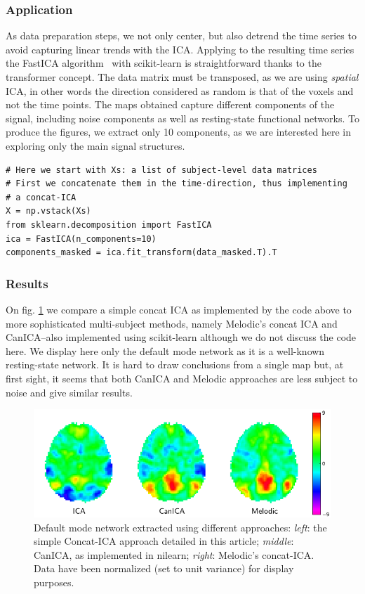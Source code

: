 \documentclass{frontiersSCNS} %
\begin{document}
\subsubsection{Application}

As data preparation steps, we not only center, but also detrend the time
series to avoid capturing linear trends with the ICA. Applying to the
resulting time series the FastICA algorithm~\citep{Hyvarinen:2000vk} with scikit-learn is
straightforward thanks to the transformer concept. The data matrix must
be transposed, as we are using \emph{spatial} ICA, in other words the
direction considered as random is that of the voxels and not the time
points. The maps obtained capture different components of the signal,
including noise components as well as resting-state functional networks.
To produce the figures, we extract only 10 components, as we are
interested here in exploring only the main signal structures.

\begin{lstlisting}
# Here we start with Xs: a list of subject-level data matrices
# First we concatenate them in the time-direction, thus implementing
# a concat-ICA
X = np.vstack(Xs)
from sklearn.decomposition import FastICA
ica = FastICA(n_components=10)
components_masked = ica.fit_transform(data_masked.T).T
\end{lstlisting}

\subsubsection{Results}

On fig. \ref{fig:ica} we compare a simple concat ICA as implemented by
the code above to more sophisticated multi-subject methods, namely Melodic's
concat ICA and CanICA--also implemented using scikit-learn although we do
not discuss the code here. We display here only the default mode network
as it is a well-known resting-state network. It is hard to draw conclusions from
a single map but, at first sight, it seems that both CanICA and Melodic
approaches are less subject to noise and give similar results.

\begin{figure}[hbtp]
  \centerline{\includegraphics[width=.9\linewidth]{scripts/ica/figure}}
  \caption{Default mode network extracted using different approaches:
\emph{left}: the simple Concat-ICA approach detailed in this article;
\emph{middle}: CanICA, as implemented in nilearn; \emph{right}: Melodic's
concat-ICA. Data have been normalized (set to unit variance) for display
purposes.}
  \label{fig:ica}
\end{figure}
\end{document}
